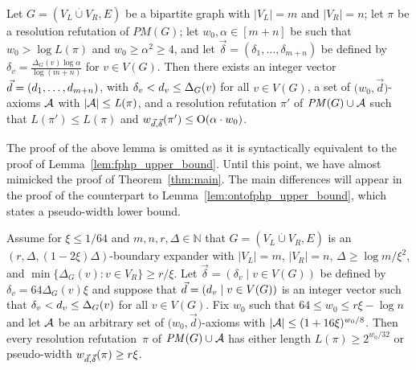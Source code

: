 \documentclass{article}
\newcommand{\bigoh}[1]{\mathrm{O} ( #1 )}
\newcommand{\N}         {\mathbb{N}}
\newcommand{\minofset}[3][:]{\min \{ #2 #1 #3 \}}
\newcommand{\setsize}[1]{\lvert#1\rvert}
\newcommand{\disjointunion}{\overset{.}{\cup}}
\newcommand{\refthm}[1]{Theorem~\ref{#1}}
\newcommand{\reflem}[1]{Lemma~\ref{#1}}
\newcommand{\refpi}{\pi}
\newcommand{\genericformsmall}[2]{\mathit{#1}( #2 )}
\newcommand{\length}[1]{\genericformsmall{L}{#1}}
\newcommand{\width}[2][]{\genericformsmall{W_{#1}}{#2}}
\newcommand{\formulaformat}[1]{\mathit{#1}}
\newcommand{\numpigeons}{m}
\newcommand{\numholes}{n}
\newcommand{\PM}{PM(G)}
\renewcommand{\PM}{\formulaformat{PM}(G)}
\renewcommand{\deg}[2][XXXXXXXXXXXX]{\Delta_{#1}(#2)}
\newcommand{\diff}{\xi}
\newcommand{\ontocdiff}{64}
\newcommand{\GdegMax}{\Delta}
\newcommand{\gdegmax}{\GdegMax}
\newcommand{\V}[1][]{V_{#1}}
\newcommand{\Vl}{\V[L]}
\newcommand{\Vr}{\V[R]}
\newcommand{\Ax}{\ensuremath\mathcal{A}}
\newcommand{\thr}[1]{ \ensuremath d_{{#1}} }
\newcommand{\vecthr}{\vec{d}}
\newcommand{\vecthrdef}[1]{\vecthr = \left(\thr{1}, \ldots, \thr{#1}\right)}
\newcommand{\adv}[1]{\delta_{{#1}}}
\newcommand{\vecadv}{\vec{\delta}}
\newcommand{\vecadvdef}[1]{\vecadv = \left(\adv{1}, \ldots, \adv{#1}\right)}
\newcommand{\fakeaxiom}{$\bigl( w_0, \vecthr \bigr)$-axiom\xspace}
\newcommand{\pseudowidth}{pseudo-width\xspace}
\renewcommand{\width}[1]{\ensuremath w_{\vecthr,\vecadv}( #1 )}
\numberwithin{equation}{section}
\begin{document}
\begin{lemma}\label{lem:ontofphp_upper_bound}
  Let $G=( \Vl \disjointunion \Vr, E)$ be a bipartite graph 
  with $\setsize{\Vl} = \numpigeons$ and 
  $\setsize{\Vr} = \numholes$;
  let $\refpi$ be a resolution refutation of $\PM$;
  let $w_0, \alpha \in [\numpigeons + \numholes]$ be such that 
  $w_0 > \log \length{\refpi}$ and
  $w_0 \ge \alpha^2 \ge 4$,
  and let $\vecadvdef{\numpigeons + \numholes}$ be defined by
  $\adv{v} = \frac{\deg[G]{v} \log \alpha}
  {\log (\numpigeons + \numholes)}$ for $v\in V(G)$.
  Then there exists 
  an integer vector $\vecthrdef{\numpigeons + \numholes}$, with 
  $\adv{v} < \thr{v} \le \deg[G]{v}$ for all 
  $v \in V(G)$, a set of \fakeaxiom{s} $\Ax$ with 
  \mbox{$\setsize{\Ax} \le \length{\refpi}$}, and a resolution refutation 
  $\refpi'$ of $\PM \cup \Ax$ such that 
  $\length{\refpi'} \leq \length{\refpi}$ and
  \mbox{$\width{\refpi'} \le \bigoh{\alpha \cdot w_0}$.}
\end{lemma}





The proof of the above lemma is omitted as it is syntactically equivalent
to the proof of \reflem{lem:fphp_upper_bound}.
Until this point, we have almost mimicked the proof of \refthm{thm:main}.
The main differences will appear in the proof of the
counterpart to \reflem{lem:ontofphp_upper_bound}, 
which states a \pseudowidth lower bound.

\begin{lemma}\label{lem:onto_lower_bound}
  Assume for
  $\diff \le 1/64$ and $m,n,r,\gdegmax \in \N$
  that
  $G=(\Vl \disjointunion \Vr, E)$ 
  is an
  $(r, \GdegMax, \left(1 - 2\diff\right)\GdegMax)$-boundary expander
  with $\setsize{\Vl} = m$, $\setsize{\Vr} = n$,
  $\GdegMax \geq {\log m}/{\diff^2}$, and 
  $\minofset{\deg[G]{v}}{v\in \Vr} \geq {r}/{\diff}$.
  Let $\vecadv = (\adv{v} \mid v \in V(G))$ be defined by
  $\adv{v} = \ontocdiff \deg[G]{v} \diff$ and suppose that
  $\vecthr = (\thr{v} \mid v \in V(G))$
  is an integer vector such
  that $\adv{v} < \thr{v} \leq \deg[G]{v}$ for all $v \in V(G)$.
  Fix $w_0$ such that $64 \leq w_0 \leq r \diff - \log n$ 
  and let $\Ax$ be
  an arbitrary set of \fakeaxiom{s} with
  $\setsize{\Ax} \le (1 + 16\diff)^{w_0/8}$. 
  Then every resolution refutation~$\refpi$ of
  $\PM \cup \Ax$ has either length
  $\length{\refpi} \ge 2^{w_0/32}$ or
  \pseudowidth
  $\width{\refpi} \ge r \diff$.
\end{lemma}
\end{document}
